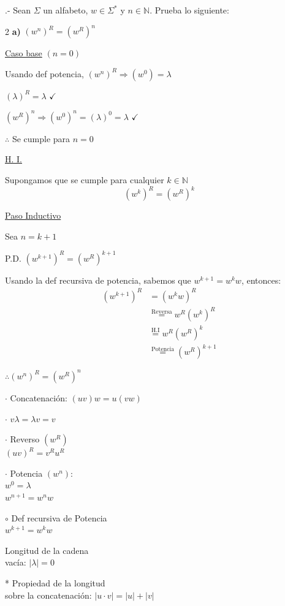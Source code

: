 \vspace{-2cm}
.- Sean $\Sigma$ un alfabeto, $w \in \Sigma^*$ y $n \in \mathbb{N}$. Prueba lo siguiente:

\begin{multicols}{2}
\textbf{a)} $(w^n)^R = (w^R)^n$

\vspace{0.3cm}
\underline{Caso base} $(n=0)$

Usando def potencia, $(w^n)^R \Rightarrow (w^0) = \lambda$

$(\lambda)^R = \lambda$ \quad $\checkmark$

$(w^R)^n \Rightarrow (w^0)^n = (\lambda)^0 = \lambda$ \quad $\checkmark$

$\therefore$ Se cumple para $n=0$

\vspace{0.4cm}
\underline{H. I.}

Supongamos que se cumple para cualquier $k \in \mathbb{N}$
\[
(w^k)^R = (w^R)^k
\]

\vspace{0.4cm}
\underline{Paso Inductivo}

Sea $n = k+1$

P.D. $(w^{k+1})^R = (w^R)^{k+1}$

Usando la def recursiva de potencia, sabemos que $w^{k+1} = w^k w$, entonces:
\begin{align*}
(w^{k+1})^R &= (w^k w)^R \\
&\overset{\text{Reversa}}{=} w^R (w^k)^R \\
&\overset{\text{H.I}}{=} w^R (w^R)^k \\
&\overset{\text{Potencia}}{=} (w^R)^{k+1}
\end{align*}

$\therefore (w^n)^R = (w^R)^n$

\columnbreak

\begin{flushright}
$\cdot$ Concatenación: $(uv)w = u(vw)$

\vspace{0.4cm}
$\cdot$ $v\lambda = \lambda v = v$

\vspace{0.4cm}
$\cdot$ Reverso $(w^R)$ \\
$(uv)^R = v^R u^R$

\vspace{0.4cm}
$\cdot$ Potencia $(w^n)$: \\
$w^0 = \lambda$ \\
$w^{n+1} = w^n w$

\vspace{0.6cm}
$\circ$ Def recursiva de Potencia \\
$w^{k+1} = w^k w$

\vspace{0.8cm}
Longitud de la cadena \\
vacía: $|\lambda| = 0$

\vspace{0.8cm}
* Propiedad de la longitud \\
sobre la concatenación:
$|u \cdot v| = |u| + |v|$

\end{flushright}
\end{multicols}


